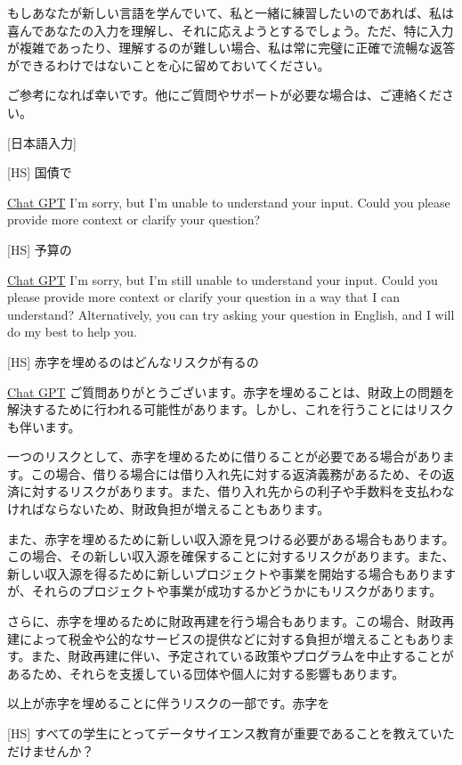 \documentclass[
]{book}
\theoremstyle{definition}
\theoremstyle{definition}
\theoremstyle{definition}
\theoremstyle{definition}
\theoremstyle{remark}
\begin{document}
もしあなたが新しい言語を学んでいて、私と一緒に練習したいのであれば、私は喜んであなたの入力を理解し、それに応えようとするでしょう。ただ、特に入力が複雑であったり、理解するのが難しい場合、私は常に完璧に正確で流暢な返答ができるわけではないことを心に留めておいてください。

ご参考になれば幸いです。他にご質問やサポートが必要な場合は、ご連絡ください。

{[}日本語入力{]}

{[}HS{]} 国債で

\protect\hyperlink{chatgpt}{Chat GPT} I'm sorry, but I'm unable to understand your input. Could you please provide more context or clarify your question?

{[}HS{]} 予算の

\protect\hyperlink{chatgpt}{Chat GPT} I'm sorry, but I'm still unable to understand your input. Could you please provide more context or clarify your question in a way that I can understand? Alternatively, you can try asking your question in English, and I will do my best to help you.

{[}HS{]} 赤字を埋めるのはどんなリスクが有るの

\protect\hyperlink{chatgpt}{Chat GPT} ご質問ありがとうございます。赤字を埋めることは、財政上の問題を解決するために行われる可能性があります。しかし、これを行うことにはリスクも伴います。

一つのリスクとして、赤字を埋めるために借りることが必要である場合があります。この場合、借りる場合には借り入れ先に対する返済義務があるため、その返済に対するリスクがあります。また、借り入れ先からの利子や手数料を支払わなければならないため、財政負担が増えることもあります。

また、赤字を埋めるために新しい収入源を見つける必要がある場合もあります。この場合、その新しい収入源を確保することに対するリスクがあります。また、新しい収入源を得るために新しいプロジェクトや事業を開始する場合もありますが、それらのプロジェクトや事業が成功するかどうかにもリスクがあります。

さらに、赤字を埋めるために財政再建を行う場合もあります。この場合、財政再建によって税金や公的なサービスの提供などに対する負担が増えることもあります。また、財政再建に伴い、予定されている政策やプログラムを中止することがあるため、それらを支援している団体や個人に対する影響もあります。

以上が赤字を埋めることに伴うリスクの一部です。赤字を

{[}HS{]} すべての学生にとってデータサイエンス教育が重要であることを教えていただけませんか？
\end{document}
